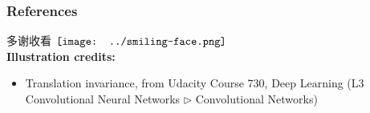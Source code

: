 \documentclass[16pt]{beamer}
\newcommand{\cc}[2]{#1}
\newcommand{\cc}[2]{#2}
\newcommand{\emp}[1]{\textbf{\color{violet}#1}}
\newcommand{\smiley}{$\vcenter{\hbox{\texttt{[image: ../smiling-face.png]}}}$}
\newif\ifframeinlbf
\begin{document}

\frameinlbffalse
\begin{frame}
\frametitle{References}
\cc{多谢收看}{Thanks for watching} \smiley \\
\printbibliography
\textbf{Illustration credits:}
\begin{itemize}
	\item Translation invariance, from Udacity Course 730, Deep Learning (L3 Convolutional Neural Networks $\rhd$ Convolutional Networks)
\end{itemize}
\end{frame}
\end{document}
